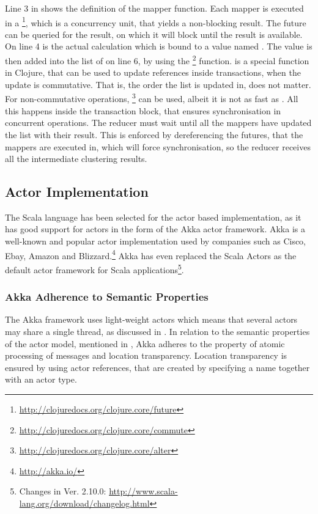 Line 3 in  shows the definition of the mapper function. Each mapper is executed in a \footnote{\url{http://clojuredocs.org/clojure.core/future}}, which is a concurrency unit, that yields a non-blocking result. The future can be queried for the result, on which it will block until the result is available. On line 4 is the actual calculation which is bound to a value named . The  value is then added into the list of  on line 6, by using the \footnote{\url{http://clojuredocs.org/clojure.core/commute}} function.  is a special function in Clojure, that can be used to update references inside transactions, when the update is commutative. That is, the order the list is updated in, does not matter. For non-commutative operations, \footnote{\url{http://clojuredocs.org/clojure.core/alter}} can be used, albeit it is not as fast as \cite{kumar2013clojure}. All this happens inside the  transaction block, that ensures synchronisation in concurrent operations. The reducer must wait until all the mappers have updated the list with their result. This is enforced by dereferencing the futures, that the mappers are executed in, which will force synchronisation, so the reducer receives all the intermediate clustering results.

\subsection{Actor Implementation}
The Scala language has been selected for the actor based implementation, as it has good support for actors in the form of the Akka actor framework. Akka is a well-known and popular actor implementation \cite[p. 4-5]{tasharofi2014efficient} used by companies such as Cisco, Ebay, Amazon and Blizzard.\footnote{\url{http://akka.io/}} Akka has even replaced the Scala Actors as the default actor framework for Scala applications\footnote{Changes in Ver. 2.10.0: \url{http://www.scala-lang.org/download/changelog.html}}.

\subsubsection{Akka Adherence to Semantic Properties}
The Akka framework uses light-weight actors which means that several actors may share a single thread\cite[p. 13]{akkaDoc}, as discussed in . 
In relation to the semantic properties of the actor model, mentioned in , Akka adheres to the property of atomic processing of messages and location transparency. Location transparency is ensured by using actor references, that are created by specifying a name together with an actor type\cite[p. 24]{akkaDoc}. 

